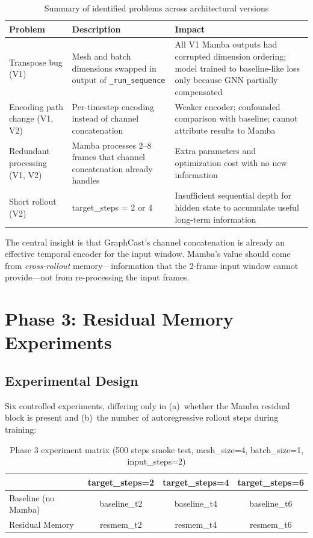 \documentclass[11pt,a4paper]{article}
\begin{document}
\begin{table}[H]
\centering
\caption{Summary of identified problems across architectural versions}
\label{tab:problems}
\begin{tabular}{p{3.2cm}p{5.5cm}p{5cm}}
\toprule
Problem & Description & Impact \\
\midrule
Transpose bug (V1) & Mesh and batch dimensions swapped in output of \texttt{\_run\_sequence} & All V1 Mamba outputs had corrupted dimension ordering; model trained to baseline-like loss only because GNN partially compensated \\
\addlinespace
Encoding path change (V1, V2) & Per-timestep encoding instead of channel concatenation & Weaker encoder; confounded comparison with baseline; cannot attribute results to Mamba \\
\addlinespace
Redundant processing (V1, V2) & Mamba processes 2--8 frames that channel concatenation already handles & Extra parameters and optimization cost with no new information \\
\addlinespace
Short rollout (V2) & target\_steps = 2 or 4 & Insufficient sequential depth for hidden state to accumulate useful long-term information \\
\bottomrule
\end{tabular}
\end{table}

The central insight is that GraphCast's channel concatenation is already an effective temporal encoder for the input window. Mamba's value should come from \emph{cross-rollout} memory---information that the 2-frame input window cannot provide---not from re-processing the input frames.

\section{Phase 3: Residual Memory Experiments}

\subsection{Experimental Design}

Six controlled experiments, differing only in (a)~whether the Mamba residual block is present and (b)~the number of autoregressive rollout steps during training:

\begin{table}[H]
\centering
\caption{Phase 3 experiment matrix (500 steps smoke test, mesh\_size=4, batch\_size=1, input\_steps=2)}
\begin{tabular}{lccc}
\toprule
 & target\_steps=2 & target\_steps=4 & target\_steps=6 \\
\midrule
Baseline (no Mamba) & baseline\_t2 & baseline\_t4 & baseline\_t6 \\
Residual Memory & resmem\_t2 & resmem\_t4 & resmem\_t6 \\
\bottomrule
\end{tabular}
\end{table}
\end{document}
